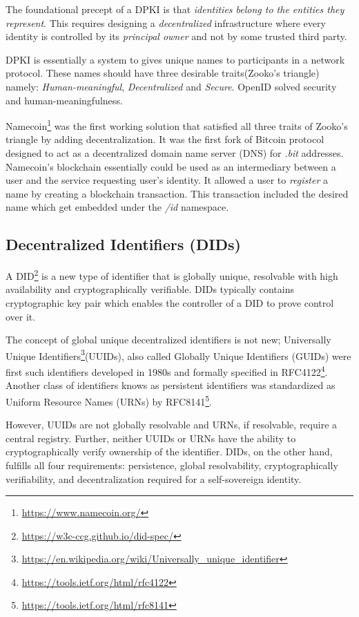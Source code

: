 		The foundational precept of a DPKI is that \textit{identities belong to the entities they represent}. This requires designing a \textit{decentralized} infrastructure where every identity is controlled by its \textit{principal owner} and not by some trusted third party\cite{allen2015decentralized}.
		
		DPKI is essentially a system to gives unique names to participants in a network protocol. These names should have three desirable traits(Zooko's triangle) namely: \textit{Human-meaningful}, \textit{Decentralized} and \textit{Secure}. OpenID solved security and human-meaningfulness.
		
		Namecoin\footnote{\url{https://www.namecoin.org/}} was the first working solution that satisfied all three traits of Zooko's triangle by adding decentralization. It was the first fork of Bitcoin\cite{nakamoto2008bitcoin} protocol designed to act as a decentralized domain name server (DNS) for \textit{.bit} addresses. Namecoin's blockchain essentially could be used as an intermediary between a user and the service requesting user's identity\cite{raval2016decentralized}. It allowed a user to \textit{register} a name by creating a blockchain transaction. This transaction included the desired name which get embedded under the \textit{/id} namespace.
	
	\subsection{Decentralized Identifiers (DIDs)}
		A DID\footnote{\url{https://w3c-ccg.github.io/did-spec/}} is a new type of identifier that is globally unique, resolvable with high availability and cryptographically verifiable. DIDs typically contains cryptographic key pair which enables the controller of a DID to prove control over it.
		
		The concept of global unique decentralized identifiers is not new; Universally Unique Identifiers\footnote{\url{https://en.wikipedia.org/wiki/Universally_unique_identifier}}(UUIDs), also called Globally Unique Identifiers (GUIDs) were first such identifiers developed in 1980s and formally specified in RFC4122\footnote{\url{https://tools.ietf.org/html/rfc4122}}. Another class of identifiers knows as persistent identifiers was standardized as Uniform Resource Names (URNs) by RFC8141\footnote{\url{https://tools.ietf.org/html/rfc8141}}.
		
		However, UUIDs are not globally resolvable and URNs, if resolvable, require a central registry. Further, neither UUIDs or URNs have the ability to cryptographically verify ownership of the identifier. DIDs, on the other hand, fulfills all four requirements: persistence, global resolvability, cryptographically verifiability, and decentralization required for a self-sovereign identity\cite{smith2016identity}.
		
